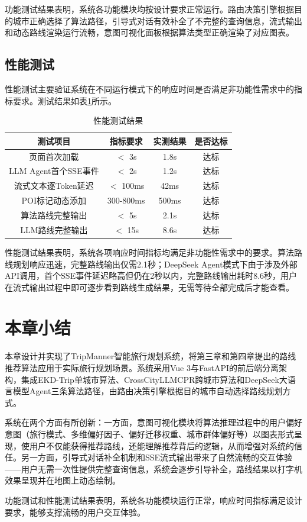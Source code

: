 功能测试结果表明，系统各功能模块均按设计要求正常运行。路由决策引擎根据目的城市正确选择了算法路径，引导式对话有效补全了不完整的查询信息，流式输出和动态路线渲染运行流畅，意图可视化面板根据算法类型正确渲染了对应图表。

\subsection{性能测试}
\label{sec:ch5_perf_test}

性能测试主要验证系统在不同运行模式下的响应时间是否满足非功能性需求中的指标要求。测试结果如表\ref{tab:ch5_perftest}所示。

\begin{table}[hbt]
  \centering
  \caption{性能测试结果}
  \label{tab:ch5_perftest}
  \begin{tabular*}{0.92\textwidth}{@{\extracolsep{\fill}}cccc}
  \toprule
    测试项目 & 指标要求 & 实测结果 & 是否达标 \\
  \midrule
    页面首次加载 & $<$ 3s & 1.8s & 达标 \\
    LLM Agent首个SSE事件 & $<$ 2s & 1.2s & 达标 \\
    流式文本逐Token延迟 & $<$ 100ms & 42ms & 达标 \\
    POI标记动态添加 & 300-800ms & 500ms & 达标 \\
    算法路线完整输出 & $<$ 5s & 2.1s & 达标 \\
    LLM路线完整输出 & $<$ 15s & 8.6s & 达标 \\
  \bottomrule
  \end{tabular*}
\end{table}

性能测试结果表明，系统各项响应时间指标均满足非功能性需求中的要求。算法路线规划响应迅速，完整路线输出仅需2.1秒；DeepSeek Agent模式下由于涉及外部API调用，首个SSE事件延迟略高但仍在2秒以内，完整路线输出耗时8.6秒，用户在流式输出过程中即可逐步看到路线生成结果，无需等待全部完成后才能查看。

\section{本章小结}
\label{sec:ch5_summary}

本章设计并实现了TripManner智能旅行规划系统，将第三章和第四章提出的路线推荐算法应用于实际旅行规划场景。系统采用Vue 3与FastAPI的前后端分离架构，集成EKD-Trip单城市算法、CrossCityLLMCPR跨城市算法和DeepSeek大语言模型Agent三条算法路径，由路由决策引擎根据目的城市自动选择路线规划方式。

系统在两个方面有所创新：一方面，意图可视化模块将算法推理过程中的用户偏好意图（旅行模式、多维偏好因子、偏好迁移权重、城市群体偏好等）以图表形式呈现，使用户不仅能获得推荐路线，还能理解推荐背后的逻辑，从而增强对系统的信任。另一方面，引导式对话补全机制和SSE流式输出带来了自然流畅的交互体验——用户无需一次性提供完整查询信息，系统会逐步引导补全，路线结果以打字机效果呈现并在地图上动态绘制。

功能测试和性能测试结果表明，系统各功能模块运行正常，响应时间指标满足设计要求，能够支撑流畅的用户交互体验。

